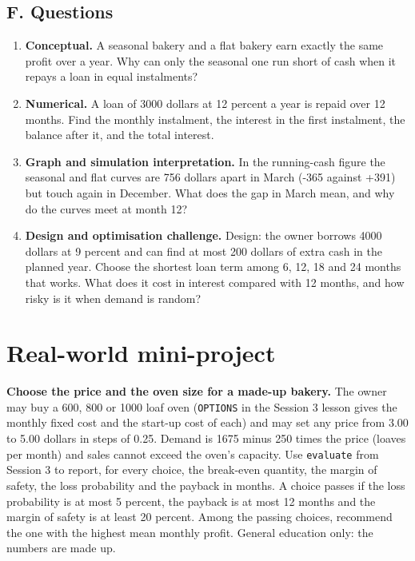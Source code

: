 \documentclass[11pt,a4paper]{article}
\begin{document}
\subsection*{F. Questions}
\begin{enumerate}[nosep]
\item \textbf{Conceptual.} A seasonal bakery and a flat bakery earn exactly the same profit over a year. Why can only the seasonal one run short of cash when it repays a loan in equal instalments?
\item \textbf{Numerical.} A loan of 3000 dollars at 12 percent a year is repaid over 12 months. Find the monthly instalment, the interest in the first instalment, the balance after it, and the total interest.
\item \textbf{Graph and simulation interpretation.} In the running-cash figure the seasonal and flat curves are 756 dollars apart in March (-365 against +391) but touch again in December. What does the gap in March mean, and why do the curves meet at month 12?
\item \textbf{Design and optimisation challenge.} Design: the owner borrows 4000 dollars at 9 percent and can find at most 200 dollars of extra cash in the planned year. Choose the shortest loan term among 6, 12, 18 and 24 months that works. What does it cost in interest compared with 12 months, and how risky is it when demand is random?
\end{enumerate}

\section{Real-world mini-project}
\textbf{Choose the price and the oven size for a made-up bakery.} The owner may buy a 600, 800 or 1000 loaf oven (\texttt{OPTIONS} in the Session 3 lesson gives the monthly fixed cost and the start-up cost of each) and may set any price from 3.00 to 5.00 dollars in steps of 0.25. Demand is 1675 minus 250 times the price (loaves per month) and sales cannot exceed the oven's capacity. Use \texttt{evaluate} from Session 3 to report, for every choice, the break-even quantity, the margin of safety, the loss probability and the payback in months. A choice passes if the loss probability is at most 5 percent, the payback is at most 12 months and the margin of safety is at least 20 percent. Among the passing choices, recommend the one with the highest mean monthly profit. General education only: the numbers are made up.
\end{document}
